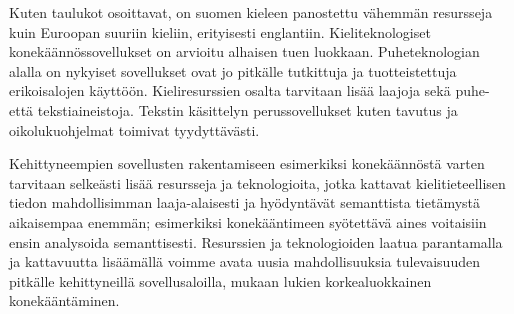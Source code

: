 \documentclass[]{../../metanetpaper}
\begin{document}
\begin{Parallel}[c]{77mm}{77mm}
{Kuten taulukot osoittavat, on suomen kieleen panostettu vähemmän
resursseja kuin Euroopan suuriin kieliin, erityisesti
englantiin. Kieliteknologiset konekäännössovellukset on arvioitu
alhaisen tuen luokkaan. Puheteknologian alalla on nykyiset sovellukset
ovat jo pitkälle tutkittuja ja tuotteistettuja erikoisalojen
käyttöön. Kieliresurssien osalta tarvitaan lisää laajoja sekä puhe-
että tekstiaineistoja. Tekstin käsittelyn perussovellukset kuten
tavutus ja oikolukuohjelmat toimivat tyydyttävästi.

Kehittyneempien sovellusten rakentamiseen esimerkiksi konekäännöstä
varten tarvitaan selkeästi lisää resursseja ja teknologioita, jotka
kattavat kielitieteellisen tiedon mahdollisimman laaja-alaisesti ja
hyödyntävät semanttista tietämystä aikaisempaa enemmän; esimerkiksi
konekääntimeen syötettävä aines voitaisiin ensin analysoida
semanttisesti. Resurssien ja teknologioiden laatua parantamalla ja
kattavuutta lisäämällä voimme avata uusia mahdollisuuksia
tulevaisuuden pitkälle kehittyneillä sovellusaloilla, mukaan lukien
korkealuokkainen konekääntäminen.
}

\end{Parallel}
\end{document}
